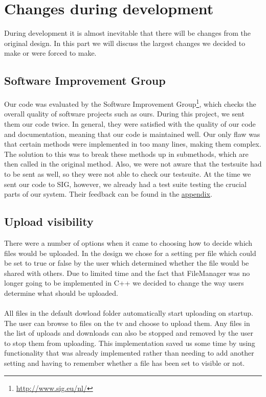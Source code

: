 \section{Changes during development}
During development it is almost inevitable that there will be changes from the original design. In this part we will discuss the largest changes we decided to make or were forced to make.

\subsection{Software Improvement Group}
Our code was evaluated by the Software Improvement Group\footnote{\url{http://www.sig.eu/nl/}}, which checks the overall quality of software projects such as ours. 
During this project, we sent them our code twice. In general, they were satisfied with the quality of our code and documentation, meaning that our
code is maintained well. Our only flaw was that certain methods were implemented in too many lines, making them complex.
The solution to this was to break these methods up in submethods, which are then called in the original method. Also, we were not aware that the testsuite 
had to be sent as well, so they were not able to check our testsuite. At the time we sent our code to SIG, however, we already had a test suite testing
the crucial parts of our system. Their feedback can be found in the \hyperref[sec:sig]{appendix}.

\subsection{Upload visibility}

There were a number of options when it came to choosing how to decide which files would be uploaded. In the design we chose for a setting per file which could be set to true or false by the user which determined whether the file would be shared with others. Due to limited time and the fact that FileManager was no longer going to be implemented in C++ we decided to change the way users determine what should be uploaded.
\\\\
All files in the default dowload folder automatically start uploading on startup. The user can browse to files on the tv and choose to upload them. Any files in the list of uploads and downloads can also be stopped and removed by the user to stop them from uploading. This implementation saved us some time by using functionality that was already implemented rather than needing to add another setting and having to remember whether a file has been set to visible or not.


